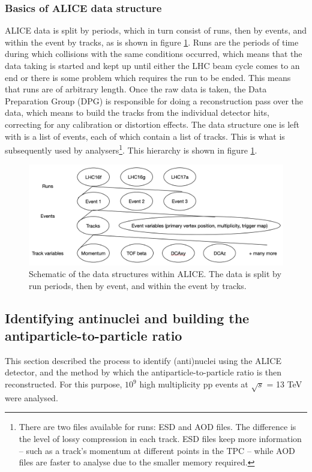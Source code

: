 \subsubsection{Basics of ALICE data structure}
ALICE data is split by periods, which in turn consist of runs, then by events, and within the event by tracks, as is shown in figure \ref{fig:ALICE_data_schematic}. Runs are the periods of time during which collisions with the same conditions occurred, which means that the data taking is started and kept up until either the LHC beam cycle comes to an end or there is some problem which requires the run to be ended. This means that runs are of arbitrary length. Once the raw data is taken, the Data Preparation Group (DPG) is responsible for doing a reconstruction pass over the data, which means to build the tracks from the individual detector hits, correcting for any calibration or distortion effects. The data structure  one is left with is a list of events, each of which contain a list of tracks. This is what is subsequently used by analysers\footnote{There are two files available for runs: ESD and AOD files. The difference is the level of lossy compression in each track. ESD files keep more information -- such as a track's momentum at different points in the TPC -- while AOD files are faster to analyse due to the smaller memory required.}. This hierarchy is shown in figure \ref{fig:ALICE_data_schematic}.

\begin{figure}
	\includegraphics[width=\textwidth]{figures/data_structure.png}
	\centering
	\caption{Schematic of the data structures within ALICE. The data is split by run periods, then by event, and within the event by tracks. }
		\label{fig:ALICE_data_schematic}
\end{figure}
\subsection{Identifying antinuclei and building the antiparticle-to-particle ratio}
This section described the process to identify (anti)nuclei using the ALICE detector, and the method by which the antiparticle-to-particle ratio is then reconstructed. For this purpose, $10^9$ high multiplicity pp events at $\sqrt{s}$ = 13 TeV were analysed. 
